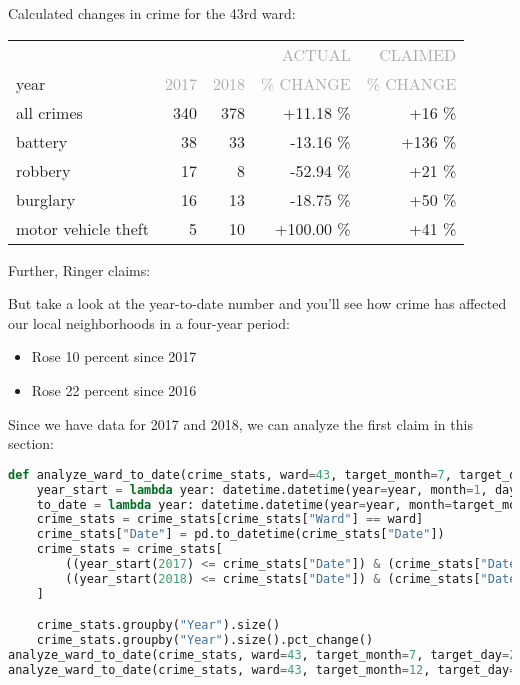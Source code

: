 \documentclass[11pt]{article}
\newcommand{\printsubsection}[1]{\normalfont\headerfontlt\textcolor{darkgray}{{#1}}}
\newcommand{\opns}[1]{\textrm{\small\printsubsection{\MakeUppercase{#1}}}}
\begin{document}
Calculated changes in crime for the 43rd ward:
\begin{table}[H]
\centering \renewcommand{\arraystretch}{1.2}
\begin{tabular}{l|rr|rr}
\multicolumn{1}{l|}{} & & & \opns{ACTUAL} & \opns{CLAIMED} \\
\multicolumn{1}{l|}{year} &    \opns{2017} &    \opns{2018} &     \opns{\% CHANGE} &     \opns{\% CHANGE} \\\hline
\multicolumn{1}{l|}{all crimes}          &  340  &  378   &  +11.18 \% & +16  \% \\
\multicolumn{1}{l|}{battery}             &    38 &    33  & -13.16  \% & +136 \% \\
\multicolumn{1}{l|}{robbery}             &    17 &     8  & -52.94  \% & +21  \% \\
\multicolumn{1}{l|}{burglary}            &    16 &    13  & -18.75  \% & +50  \% \\
\multicolumn{1}{l|}{motor vehicle theft} &     5 &    10  & +100.00 \% & +41  \% \\
\end{tabular}
\end{table}
\pagebreak
Further, Ringer claims:
\begin{mdframed}[topline=false, bottomline=false, rightline=false,linewidth=2pt,linecolor=gray]
But take a look at the year-to-date number and you'll see how crime has affected our local neighborhoods in a four-year period:
\begin{itemize}
\item Rose 10 percent since 2017
\item Rose 22 percent since 2016
\end{itemize}
\end{mdframed}
Since we have data for 2017 and 2018, we can analyze the first claim in this section: 
\begin{lstlisting}[language=Python,numbers=none]
def analyze_ward_to_date(crime_stats, ward=43, target_month=7, target_day=26):
    year_start = lambda year: datetime.datetime(year=year, month=1, day=1)
    to_date = lambda year: datetime.datetime(year=year, month=target_month, day=target_day)
    crime_stats = crime_stats[crime_stats["Ward"] == ward]
    crime_stats["Date"] = pd.to_datetime(crime_stats["Date"])
    crime_stats = crime_stats[
        ((year_start(2017) <= crime_stats["Date"]) & (crime_stats["Date"] <= to_date(2017))) | 
        ((year_start(2018) <= crime_stats["Date"]) & (crime_stats["Date"] <= to_date(2018)))
    ]

    crime_stats.groupby("Year").size()
    crime_stats.groupby("Year").size().pct_change()
analyze_ward_to_date(crime_stats, ward=43, target_month=7, target_day=26)
analyze_ward_to_date(crime_stats, ward=43, target_month=12, target_day=31)
\end{lstlisting}
\end{document}

